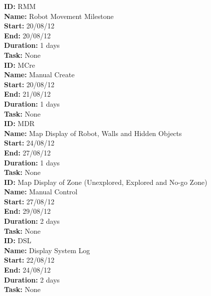 \documentclass[11pt, a4paper]{report}
\begin{document}
\noindent \textbf{ID:} RMM \\
\noindent \textbf{Name:} Robot Movement Milestone \\
\noindent \textbf{Start:} 20/08/12 \\
\noindent \textbf{End:} 20/08/12 \\
\noindent \textbf{Duration:} 1 days \\
\noindent \textbf{Task:} None\\[0.5cm]

\noindent \textbf{ID:} MCre \\
\noindent \textbf{Name:} Manual Create \\
\noindent \textbf{Start:} 20/08/12 \\
\noindent \textbf{End:} 21/08/12 \\
\noindent \textbf{Duration:} 1 days \\
\noindent \textbf{Task:} None\\[0.5cm]

\noindent \textbf{ID:} MDR \\
\noindent \textbf{Name:} Map Display of Robot, Walls and Hidden Objects \\
\noindent \textbf{Start:} 24/08/12 \\
\noindent \textbf{End:} 27/08/12 \\
\noindent \textbf{Duration:} 1 days \\
\noindent \textbf{Task:} None\\[0.5cm]

\noindent \textbf{ID:} Map Display of Zone (Unexplored, Explored and No-go Zone) \\
\noindent \textbf{Name:} Manual Control \\
\noindent \textbf{Start:} 27/08/12 \\
\noindent \textbf{End:} 29/08/12 \\
\noindent \textbf{Duration:} 2 days \\
\noindent \textbf{Task:} None\\[0.5cm]

\noindent \textbf{ID:} DSL \\
\noindent \textbf{Name:} Display System Log \\
\noindent \textbf{Start:} 22/08/12 \\
\noindent \textbf{End:} 24/08/12 \\
\noindent \textbf{Duration:} 2 days \\
\noindent \textbf{Task:} None\\[0.5cm]
\end{document}
